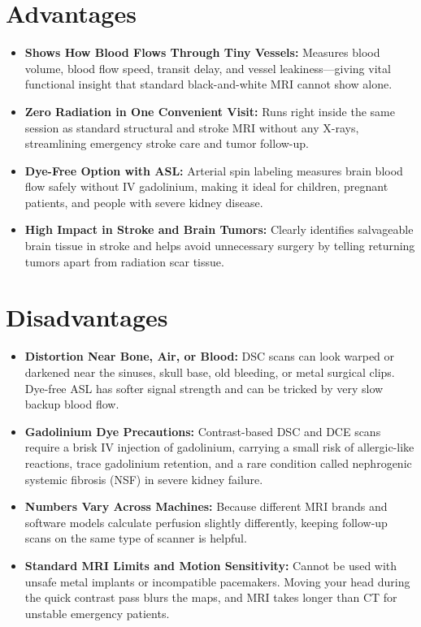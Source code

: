 \section{Advantages}

\begin{itemize}
    \item \textbf{Shows How Blood Flows Through Tiny Vessels:} Measures blood volume, blood flow speed, transit delay, and vessel leakiness---giving vital functional insight that standard black-and-white MRI cannot show alone.
    \item \textbf{Zero Radiation in One Convenient Visit:} Runs right inside the same session as standard structural and stroke MRI without any X-rays, streamlining emergency stroke care and tumor follow-up.
    \item \textbf{Dye-Free Option with ASL:} Arterial spin labeling measures brain blood flow safely without IV gadolinium, making it ideal for children, pregnant patients, and people with severe kidney disease.
    \item \textbf{High Impact in Stroke and Brain Tumors:} Clearly identifies salvageable brain tissue in stroke and helps avoid unnecessary surgery by telling returning tumors apart from radiation scar tissue.
\end{itemize}

\section{Disadvantages}

\begin{itemize}
    \item \textbf{Distortion Near Bone, Air, or Blood:} DSC scans can look warped or darkened near the sinuses, skull base, old bleeding, or metal surgical clips. Dye-free ASL has softer signal strength and can be tricked by very slow backup blood flow.
    \item \textbf{Gadolinium Dye Precautions:} Contrast-based DSC and DCE scans require a brisk IV injection of gadolinium, carrying a small risk of allergic-like reactions, trace gadolinium retention, and a rare condition called nephrogenic systemic fibrosis (NSF) in severe kidney failure.
    \item \textbf{Numbers Vary Across Machines:} Because different MRI brands and software models calculate perfusion slightly differently, keeping follow-up scans on the same type of scanner is helpful.
    \item \textbf{Standard MRI Limits and Motion Sensitivity:} Cannot be used with unsafe metal implants or incompatible pacemakers. Moving your head during the quick contrast pass blurs the maps, and MRI takes longer than CT for unstable emergency patients.
\end{itemize}

